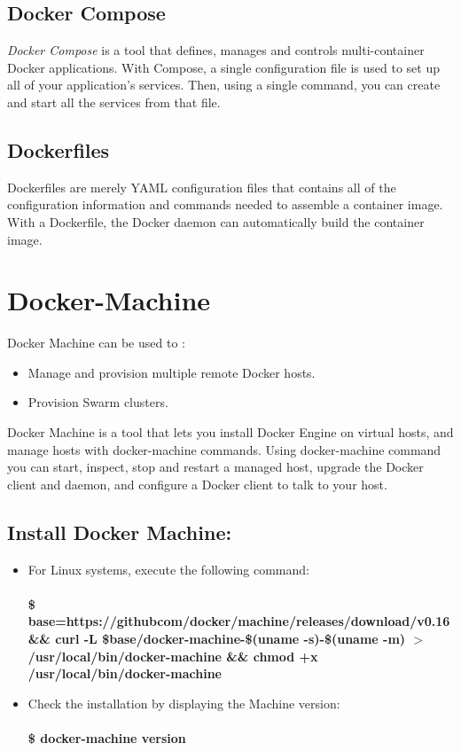 \documentclass[12pt]{report}
\begin{document}
\subsection{Docker Compose}
\textit{Docker Compose} is a tool that defines, manages and controls multi-container Docker applications. With Compose, a single configuration file is used to set up all of your application’s services. Then, using a single command, you can create and start all the services from that file.
\subsection{Dockerfiles}
Dockerfiles are merely YAML configuration files that contains all of the configuration information and commands needed to assemble a container image. With a Dockerfile, the Docker daemon can automatically build the container image.
\section{Docker-Machine}
Docker Machine can be used to :
\begin{itemize}
	\item Manage and provision multiple remote Docker hosts.
	\item Provision Swarm clusters.
\end{itemize}
Docker Machine is a tool that lets you install Docker Engine on virtual hosts, and manage hosts with docker-machine commands. Using docker-machine command you can start, inspect, stop and restart a managed host, upgrade the Docker client and daemon, and configure a Docker client to talk to your host.
\subsection{Install Docker Machine:}
\begin{itemize}
	\item For Linux systems, execute the following command:\\\\
	\textbf{\$ base=https://githubcom/docker/machine/releases/download/v0.16 \&\& curl -L \$base/docker-machine-\$(uname -s)-\$(uname -m) $>$/usr/local/bin/docker-machine \&\& chmod +x /usr/local/bin/docker-machine}
	\item Check the installation by displaying the Machine version:\\\\
	\textbf{\$ docker-machine version}
\end{itemize}
\end{document}
